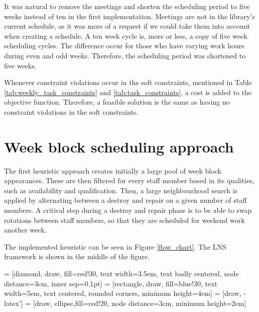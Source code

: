 It was natural to remove the meetings and shorten the scheduling period to five weeks instead of ten in the first implementation. Meetings are not in the library's current schedule, as it was more of a request if we could take them into account when creating a schedule. A ten week cycle is, more or less, a copy of five week scheduling cycles. The difference occur for those who have varying work hours during even and odd weeks. Therefore, the scheduling period was shortened to five weeks.

Whenever constraint violations occur in the soft constraints, mentioned in Table \ref{tab:weekly_task_constraints} and \ref{tab:task_constraints}, a cost is added to the objective function. Therefore, a feasible solution is the same as having no constraint violations in the soft constraints. 

\section{Week block scheduling approach}

The first heuristic approach creates initially a large pool of week block appearances. These are then filtered for every staff member based in its qualities, such as availability and qualification. Then, a large neighbourhood search is applied by alternating between a destroy and repair on a given number of staff members. A critical step during a destroy and repair phase is to be able to swap rotations between staff members, so that they are scheduled for weekend work another week.

The implemented heuristic can be seen in Figure \ref{flow_chart}. The LNS framework is shown in the middle of the figure.

 = [diamond, draw, fill=red!30,
    text width=3.5em, text badly centered, node distance=3cm, inner sep=0.1pt]
 = [rectangle, draw, fill=blue!30,
    text width=5em, text centered, rounded corners, minimum height=4em]
 = [draw, -latex']
 = [draw, ellipse,fill=red!20, node distance=3cm,
    minimum height=2em]

